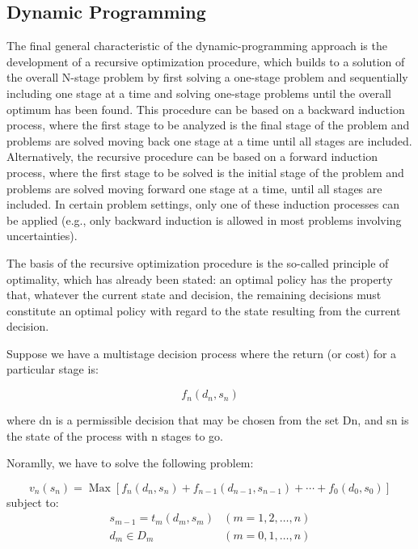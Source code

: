 \documentclass{mcmthesis}
\begin{document}
\subsection{Dynamic Programming}
The final general characteristic of the dynamic-programming approach is the development of a recursive optimization procedure, which builds to a solution of the overall N-stage problem by first solving a one-stage problem and sequentially including one stage at a time and solving one-stage problems until the overall optimum has been found. This procedure can be based on a backward induction process, where the first stage to be analyzed is the final stage of the problem and problems are solved moving back one stage at a time until all stages are included. Alternatively, the recursive procedure can be based on a forward induction process, where the first stage to be solved is the initial stage of the problem and problems are solved moving forward
one stage at a time, until all stages are included. In certain problem settings, only one of these induction processes can be applied (e.g., only backward induction is allowed in most problems involving uncertainties).

The basis of the recursive optimization procedure is the so-called principle of optimality, which has already been stated: an optimal policy has the property that, whatever the current state and decision, the remaining decisions must constitute an optimal policy with regard to the state resulting from the current decision.

Suppose we have a multistage decision process where the return (or cost) for a particular stage is:

$$f_n(d_n,s_n)$$

where dn is a permissible decision that may be chosen from the set Dn, and sn is the state of the process with n stages to go.

Noramlly, we have to solve the following problem:

\[
v_{n}\left(s_{n}\right)=\operatorname{Max}\left[f_{n}\left(d_{n}, s_{n}\right)+f_{n-1}\left(d_{n-1}, s_{n-1}\right)+\cdots+f_{0}\left(d_{0}, s_{0}\right)\right]
\]
subject to:
\[
\begin{array}{ll}
s_{m-1}=t_{m}\left(d_{m}, s_{m}\right) & (m=1,2, \ldots, n) \\
d_{m} \in D_{m} & (m=0,1, \ldots, n)
\end{array}
\]

\end{document}
